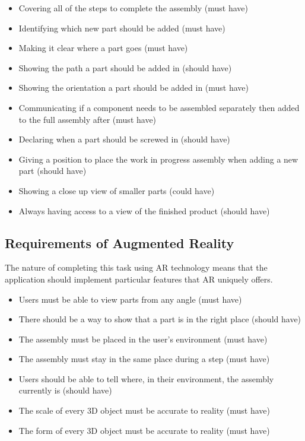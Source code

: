 \documentclass{l4proj}
\begin{document}
\begin{itemize}
    \item Covering all of the steps to complete the assembly (must have)
    \item Identifying which new part should be added (must have)
    \item Making it clear where a part goes (must have)
    \item Showing the path a part should be added in (should have)
    \item Showing the orientation a part should be added in (must have)
    \item Communicating if a component needs to be assembled separately then added to the full assembly after (must have)
    \item Declaring when a part should be screwed in (should have)
    \item Giving a position to place the work in progress assembly when adding a new part (should have)
    \item Showing a close up view of smaller parts (could have)
    \item Always having access to a view of the finished product (should have)
\end{itemize}

\subsection{Requirements of Augmented Reality}

The nature of completing this task using AR technology means that the application should implement particular features that AR uniquely offers. 

\begin{itemize}
    \item Users must be able to view parts from any angle (must have)
    \item There should be a way to show that a part is in the right place (should have)
    \item The assembly must be placed in the user's environment (must have)
    \item The assembly must stay in the same place during a step (must have)
    \item Users should be able to tell where, in their environment, the assembly currently is (should have)
    \item The scale of every 3D object must be accurate to reality (must have)
    \item The form of every 3D object must be accurate to reality (must have)
\end{itemize}
\end{document}

